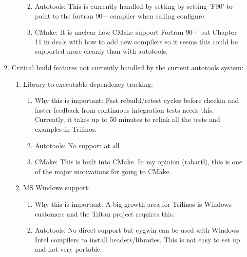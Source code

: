 \documentclass[pdf,ps2pdf,11pt]{SANDreport}
\begin{document}
\begin{enumerate}
\begin{enumerate}
\begin{enumerate}
    {}\item Autotools: This is currently handled by setting by setting
    'F90' to point to the fortran 90+ compiler when calling configure.

    {}\item CMake: It is unclear how CMake support Fortran 90+ but
    Chapter 11 in {}\cite{MasteringCMake_fourth} deals with how to add
    new compilers so it seems this could be supported more cleanly
    than with autotools.

    \end{enumerate}

  \end{enumerate}

{}\item Critical build features not currently handled by the current
autotools system:

  \begin{enumerate}

  {}\item Library to executable dependency tracking:

    \begin{enumerate}

    {}\item Why this is important: Fast rebuild/retest cycles before
    checkin and faster feedback from continuous integration tests
    needs this.  Currently, it takes up to 50 minutes to relink all
    the tests and examples in Trilinos.

    {}\item Autotools: No support at all

    {}\item CMake: This is built into CMake.  In my opinion (rabartl),
    this is one of the major motivations for going to CMake.

    \end{enumerate}

  {}\item MS Windows support:

    \begin{enumerate}

    {}\item Why this is important: A big growth area for Trilinos is
    Windows customers and the Tritan project requires this.

    {}\item Autotools: No direct support but cygwin can be used with
    Windows Intel compilers to install headers/libraries.  This is not
    easy to set up and not very portable.


\end{enumerate}
\end{enumerate}
\end{enumerate}
\end{document}
